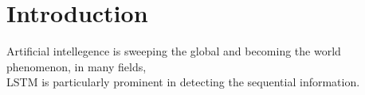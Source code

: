 \section{Introduction}
Artificial intellegence is sweeping the global and becoming the world phenomenon, in many fields, 
\\
LSTM is particularly prominent in detecting the sequential information. 